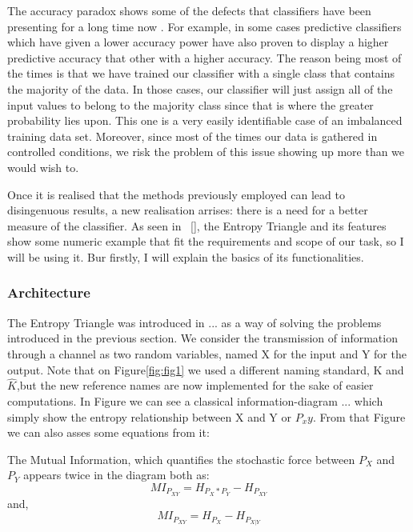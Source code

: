 \documentclass[12pt]{report}
\begin{document}
The accuracy paradox shows some of the defects that classifiers have been presenting for a long time now . For example, in some cases predictive classifiers which have given a lower accuracy power have also proven to display a higher predictive accuracy that other with a higher accuracy. The reason being most of the times is that we have trained our classifier with a single class that contains the majority of the data. In those cases, our classifier will just assign all of the input values to belong to the majority class since that is where the greater probability lies upon. This one is a very easily identifiable case of an imbalanced training data set. Moreover, since most of the times our data is gathered in controlled conditions, we risk the problem of this issue showing up more than we would wish to.\par

Once it is realised that the methods previously employed can lead to disingenuous results, a new realisation arrises: there is a need for a better measure of the classifier. As seen in  [], the Entropy Triangle and its features show some numeric example that fit the requirements and scope of our task, so I will be using it. Bur firstly, I will explain the basics of its functionalities.\par

\subsubsection{Architecture}

The Entropy Triangle was introduced in ... as a way of solving the problems introduced in the previous section. We consider the transmission of information through a channel as two random variables, named X for the input and Y for the output. Note that on Figure\ref{fig:fig1} we used a different naming standard, K and $\hat{K}$,but the new reference names are now implemented for the sake of easier computations. In Figure we can see a classical information-diagram ... which simply show the entropy relationship between X and Y or $P_xy$. From that Figure we can also asses some equations from it:\par

The Mutual Information, which quantifies the stochastic force between $P_X$ and $P_Y$ appears twice in the diagram both as:
\begin{equation}\label{eq:mutual_information_1}
MI_{P_{XY}} = H_{P_X * P_Y} - H_{P_{XY}}
\end{equation}
and,
\begin{equation}\label{eq:mutual_information_2}
MI_{P_{XY}} = H_{P_X} - H_{P_{X|Y}}
\end{equation}
\end{document}
